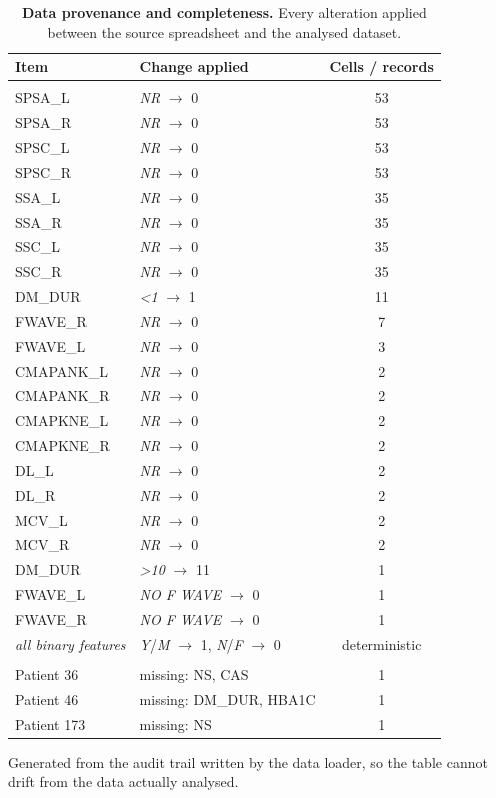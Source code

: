 \begin{table}[!ht]
\centering
\footnotesize
\caption{\textbf{Data provenance and completeness.} Every alteration applied between the source spreadsheet and the analysed dataset.}
\label{tab:provenance}
\begin{tabular}{llc}
\toprule
\textbf{Item} & \textbf{Change applied} & \textbf{Cells / records} \\
\midrule
\addlinespace
\multicolumn{3}{l}{\textit{Value recoding}} \\
SPSA\_L & \textit{NR} $\rightarrow$ 0 & 53 \\
SPSA\_R & \textit{NR} $\rightarrow$ 0 & 53 \\
SPSC\_L & \textit{NR} $\rightarrow$ 0 & 53 \\
SPSC\_R & \textit{NR} $\rightarrow$ 0 & 53 \\
SSA\_L & \textit{NR} $\rightarrow$ 0 & 35 \\
SSA\_R & \textit{NR} $\rightarrow$ 0 & 35 \\
SSC\_L & \textit{NR} $\rightarrow$ 0 & 35 \\
SSC\_R & \textit{NR} $\rightarrow$ 0 & 35 \\
DM\_DUR & \textit{<1} $\rightarrow$ 1 & 11 \\
FWAVE\_R & \textit{NR} $\rightarrow$ 0 & 7 \\
FWAVE\_L & \textit{NR} $\rightarrow$ 0 & 3 \\
CMAPANK\_L & \textit{NR} $\rightarrow$ 0 & 2 \\
CMAPANK\_R & \textit{NR} $\rightarrow$ 0 & 2 \\
CMAPKNE\_L & \textit{NR} $\rightarrow$ 0 & 2 \\
CMAPKNE\_R & \textit{NR} $\rightarrow$ 0 & 2 \\
DL\_L & \textit{NR} $\rightarrow$ 0 & 2 \\
DL\_R & \textit{NR} $\rightarrow$ 0 & 2 \\
MCV\_L & \textit{NR} $\rightarrow$ 0 & 2 \\
MCV\_R & \textit{NR} $\rightarrow$ 0 & 2 \\
DM\_DUR & \textit{>10} $\rightarrow$ 11 & 1 \\
FWAVE\_L & \textit{NO F WAVE} $\rightarrow$ 0 & 1 \\
FWAVE\_R & \textit{NO F WAVE} $\rightarrow$ 0 & 1 \\
\textit{all binary features} & \textit{Y}/\textit{M} $\rightarrow$ 1, \textit{N}/\textit{F} $\rightarrow$ 0 & deterministic \\
\addlinespace
\multicolumn{3}{l}{\textit{Excluded records}} \\
Patient 36 & missing: NS, CAS & 1 \\
Patient 46 & missing: DM\_DUR, HBA1C & 1 \\
Patient 173 & missing: NS & 1 \\
\bottomrule
\end{tabular}
\begin{flushleft}\footnotesize Generated from the audit trail written by the data loader, so the table cannot drift from the data actually analysed.\end{flushleft}
\end{table}
